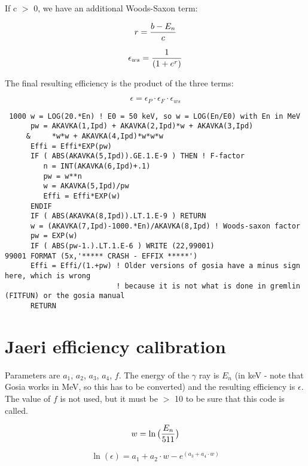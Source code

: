 If c $>$ 0, we have an additional Woods-Saxon term:

\begin{equation}
r = {b - E_n \over c}
\end{equation}

\begin{equation}
\epsilon_{ws} = {1 \over (1 + e^r)}
\end{equation}

The final resulting efficiency is the product of the three terms:

\begin{equation}
\epsilon = \epsilon_P \cdot \epsilon_F \cdot \epsilon_{ws}
\end{equation}

\begin{verbatim}
 1000 w = LOG(20.*En) ! E0 = 50 keV, so w = LOG(En/E0) with En in MeV
      pw = AKAVKA(1,Ipd) + AKAVKA(2,Ipd)*w + AKAVKA(3,Ipd)
     &     *w*w + AKAVKA(4,Ipd)*w*w*w
      Effi = Effi*EXP(pw)
      IF ( ABS(AKAVKA(5,Ipd)).GE.1.E-9 ) THEN ! F-factor
         n = INT(AKAVKA(6,Ipd)+.1)
         pw = w**n
         w = AKAVKA(5,Ipd)/pw
         Effi = Effi*EXP(w)
      ENDIF
      IF ( ABS(AKAVKA(8,Ipd)).LT.1.E-9 ) RETURN
      w = (AKAVKA(7,Ipd)-1000.*En)/AKAVKA(8,Ipd) ! Woods-saxon factor
      pw = EXP(w)
      IF ( ABS(pw-1.).LT.1.E-6 ) WRITE (22,99001)
99001 FORMAT (5x,'***** CRASH - EFFIX *****')
      Effi = Effi/(1.+pw) ! Older versions of gosia have a minus sign here, which is wrong
                          ! because it is not what is done in gremlin (FITFUN) or the gosia manual
      RETURN
\end{verbatim}

\section{Jaeri efficiency calibration}

Parameters are $a_1$, $a_2$, $a_3$, $a_4$, $f$. The energy of the $\gamma$
ray is $E_n$ (in keV - note that Gosia works in MeV, so this has to be
converted) and the resulting efficiency is $\epsilon$. The value of $f$ is
not used, but it must be $>$ 10 to be sure that this code is called.

\begin{equation}
w = \ln\big({E_n \over 511}\big)
\end{equation}

\begin{equation}
\ln(\epsilon) = a_1 + a_2 \cdot w - e^{(a_3 + a_4 \cdot w)}
\end{equation}

